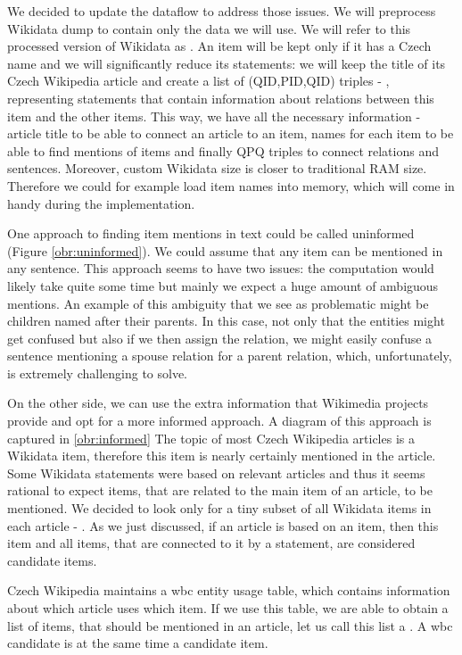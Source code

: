 We decided to update the dataflow to address those issues. We will preprocess Wikidata dump to contain only the data we will use. We will refer to this processed version of Wikidata as . An item will be kept only if it has a Czech name and we will significantly reduce its statements: we will keep the title of its Czech Wikipedia article and create a list of (QID,PID,QID) triples - , representing statements that contain information about relations between this item and the other items. This way, we have all the necessary information - article title to be able to connect an article to an item, names for each item to be able to find mentions of items and finally QPQ triples to connect relations and sentences. Moreover, custom Wikidata size is closer to traditional RAM size. Therefore we could for example load item names into memory, which will come in handy during the implementation.

One approach to finding item mentions in text could be called uninformed (Figure \ref{obr:uninformed}). We could assume that any item can be mentioned in any sentence. This approach seems to have two issues: the computation would likely take quite some time but mainly we expect a huge amount of ambiguous mentions. An example of this ambiguity that we see as problematic might be children named after their parents. In this case, not only that the entities might get confused but also if we then assign the relation, we might easily confuse a sentence mentioning a spouse relation for a parent relation, which, unfortunately, is extremely challenging to solve. 

On the other side, we can use the extra information that Wikimedia projects provide and opt for a more informed approach. A diagram of this approach is captured in \ref{obr:informed} The topic of most Czech Wikipedia articles is a Wikidata item, therefore this item is nearly certainly mentioned in the article. Some Wikidata statements were based on relevant articles and thus it seems rational to expect items, that are related to the main item of an article, to be mentioned. We decided to look only for a tiny subset of all Wikidata items in each article - . As we just discussed, if an article is based on an item, then this item and all items, that are connected to it by a statement, are considered candidate items.

Czech Wikipedia maintains a wbc entity usage table, which contains information about which article uses which item. If we use this table, we are able to obtain a list of items, that should be mentioned in an article, let us call this list a . A wbc candidate is at the same time a candidate item.

